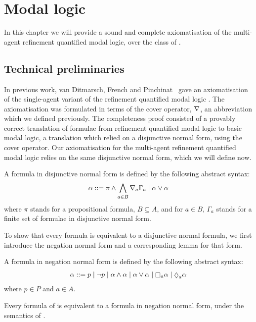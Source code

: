 \chapter{Modal logic}\label{k}

In this chapter we will provide a sound and complete axiomatisation of the
multi-agent refinement quantified modal logic, over the class of \classK{}. 

\section{Technical preliminaries}

In previous work, van Ditmarsch, French and Pinchinat~\cite{french2010future}
gave an axiomatisation of the single-agent variant of the refinement quantified
modal logic \logicKF{}.  The axiomatisation was formulated in terms of the cover
operator, $\nabla$, an abbreviation which we defined previously. The
completeness proof consisted of a provably correct translation of formulae from
refinement quantified modal logic to basic modal logic, a translation which
relied on a disjunctive normal form, using the cover operator. Our
axiomatisation for the multi-agent refinement quantified modal logic relies on
the same disjunctive normal form, which we will define now.

\begin{definition}
A formula in disjunctive normal form is defined by the following abstract syntax:
$$
\alpha ::= \pi \land \bigwedge_{a \in B} \nabla_a \Gamma_a \mid \alpha \lor \alpha
$$
where $\pi$ stands for a propositional formula, $B \subseteq A$, and for $a \in
B$, $\Gamma_a$ stands for a finite set of formulae in disjunctive normal form.
\end{definition}

To show that every \lang{} formula is equivalent to a disjunctive normal
formula, we first introduce the negation normal form and a corresponding lemma
for that form.

\begin{definition}
A formula in negation normal form is defined by the following abstract syntax:
$$
\alpha ::= p \bnfalt 
\neg p \bnfalt
\alpha \land \alpha \bnfalt
\alpha \lor \alpha \bnfalt
\knows_a \alpha \bnfalt
\suspects_a \alpha
$$
where $p \in P$ and $a \in A$.
\end{definition}

\begin{lemma}\label{k-nnf}
Every formula of \lang{} is equivalent to a formula in negation normal form,
under the semantics of \logicK{}.
\end{lemma}

